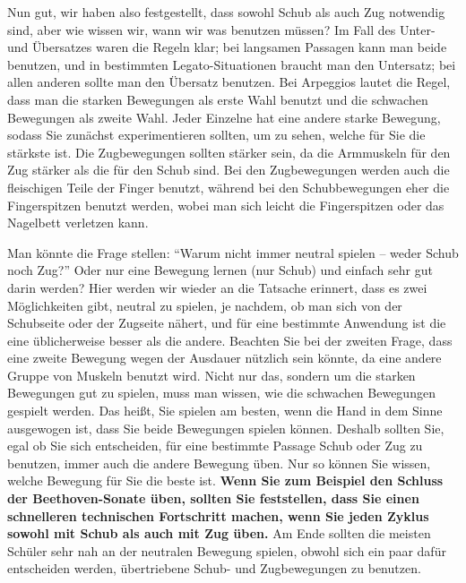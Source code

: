 Nun gut, wir haben also festgestellt, dass sowohl Schub als auch Zug notwendig sind, aber wie wissen wir, wann wir was benutzen müssen?
Im Fall des Unter- und Übersatzes waren die Regeln klar; bei langsamen Passagen kann man beide benutzen, und in bestimmten Legato-Situationen braucht man den Untersatz; bei allen anderen sollte man den Übersatz benutzen.
Bei Arpeggios lautet die Regel, dass man die starken Bewegungen als erste Wahl benutzt und die schwachen Bewegungen als zweite Wahl.
Jeder Einzelne hat eine andere starke Bewegung, sodass Sie zunächst experimentieren sollten, um zu sehen, welche für Sie die stärkste ist.
Die Zugbewegungen sollten stärker sein, da die Armmuskeln für den Zug stärker als die für den Schub sind.
Bei den Zugbewegungen werden auch die fleischigen Teile der Finger benutzt, während bei den Schubbewegungen eher die Fingerspitzen benutzt werden, wobei man sich leicht die Fingerspitzen oder das Nagelbett verletzen kann.

Man könnte die Frage stellen: \enquote{Warum nicht immer neutral spielen -- weder Schub noch Zug?}
Oder nur eine Bewegung lernen (nur Schub) und einfach sehr gut darin werden?
Hier werden wir wieder an die Tatsache erinnert, dass es zwei Möglichkeiten gibt, neutral zu spielen, je nachdem, ob man sich von der Schubseite oder der Zugseite nähert, und für eine bestimmte Anwendung ist die eine üblicherweise besser als die andere.
Beachten Sie bei der zweiten Frage, dass eine zweite Bewegung wegen der Ausdauer nützlich sein könnte, da eine andere Gruppe von Muskeln benutzt wird.
Nicht nur das, sondern um die starken Bewegungen gut zu spielen, muss man wissen, wie die schwachen Bewegungen gespielt werden.
Das heißt, Sie spielen am besten, wenn die Hand in dem Sinne ausgewogen ist, dass Sie beide Bewegungen spielen können.
Deshalb sollten Sie, egal ob Sie sich entscheiden, für eine bestimmte Passage Schub oder Zug zu benutzen, immer auch die andere Bewegung üben.
Nur so können Sie wissen, welche Bewegung für Sie die beste ist.
\textbf{Wenn Sie zum Beispiel den Schluss der Beethoven-Sonate üben, sollten Sie feststellen, dass Sie einen schnelleren technischen Fortschritt machen, wenn Sie jeden Zyklus sowohl mit Schub als auch mit Zug üben.}
Am Ende sollten die meisten Schüler sehr nah an der neutralen Bewegung spielen, obwohl sich ein paar dafür entscheiden werden, übertriebene Schub- und Zugbewegungen zu benutzen.

